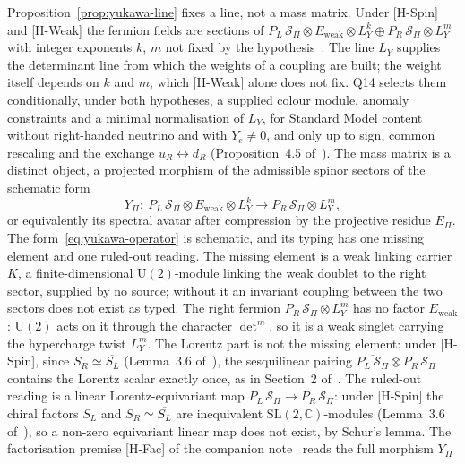 \documentclass[11pt]{article}
\theoremstyle{definition}
\theoremstyle{remark}
\newcommand{\Epi}{E_{\Pi}}
\newcommand{\Sbundle}{\mathcal{S}_{\Pi}}
\newcommand{\Ew}{E_{\mathrm{weak}}}
\newcommand{\LY}{L_{Y}}
\newcommand{\UU}{\mathrm{U}}
\newcommand{\SL}{\mathrm{SL}}
\begin{document}
    Proposition~\ref{prop:yukawa-line} fixes a line, not a mass matrix.
    Under [H-Spin] and [H-Weak] the fermion fields are sections of
    $P_{L}\,\Sbundle \otimes \Ew \otimes \LY^{k} \oplus P_{R}\,\Sbundle \otimes
    \LY^{m}$ with integer exponents $k$, $m$ not fixed by the hypothesis~\cite{Beau2026q14}.
    The line $\LY$ supplies the determinant line from which the weights of a coupling are built; the weight itself
    depends on $k$ and $m$, which [H-Weak] alone does not fix.
    Q14 selects them conditionally, under both hypotheses, a supplied colour module, anomaly constraints and a minimal
    normalisation of $\LY$, for Standard Model content without right-handed neutrino and with $Y_{e} \neq 0$, and only
    up to sign, common rescaling and the exchange $u_{R} \leftrightarrow d_{R}$ (Proposition~4.5 of~\cite{Beau2026q14}).
    The mass matrix is a distinct object, a projected morphism of the admissible spinor sectors of the schematic form
    \begin{equation}
      \label{eq:yukawa-operator}
      Y_{\Pi}:\ P_{L}\,\Sbundle \otimes \Ew \otimes \LY^{k} \longrightarrow P_{R}\,\Sbundle \otimes \LY^{m},
    \end{equation}
    or equivalently its spectral avatar after compression by the projective residue $\Epi$.
    The form~\eqref{eq:yukawa-operator} is schematic, and its typing has one missing element and one ruled-out reading.
    The missing element is a weak linking carrier $K$, a finite-dimensional $\UU(2)$-module linking the weak doublet to
    the right sector, supplied by no source; without it an invariant coupling between the two sectors does not
    exist as typed.
    The right fermion $P_{R}\,\Sbundle \otimes \LY^{m}$ has no factor $\Ew$:
    $\UU(2)$ acts on it through the character $\det^{m}$, so it is a weak singlet
    carrying the hypercharge twist $\LY^{m}$.
    The Lorentz part is not the missing element: under [H-Spin], since $S_{R} \simeq \overline{S_{L}}$
    (Lemma~3.6 of~\cite{Beau2026q14}), the sesquilinear pairing $\overline{P_{L}\,\Sbundle} \otimes P_{R}\,\Sbundle$
    contains the Lorentz scalar exactly once, as in Section~2 of~\cite{Beau2026pyo}.
    The ruled-out reading is a linear Lorentz-equivariant map $P_{L}\,\Sbundle \to P_{R}\,\Sbundle$: under [H-Spin]
    the chiral factors $S_{L}$ and $S_{R} \simeq \overline{S_{L}}$ are inequivalent $\SL(2,\mathbb{C})$-modules
    (Lemma~3.6 of~\cite{Beau2026q14}), so a non-zero equivariant linear map does not exist, by Schur's lemma.
    The factorisation premise [H-Fac] of the companion note~\cite{Beau2026pyo} reads the full morphism $Y_{\Pi}$
\end{document}
